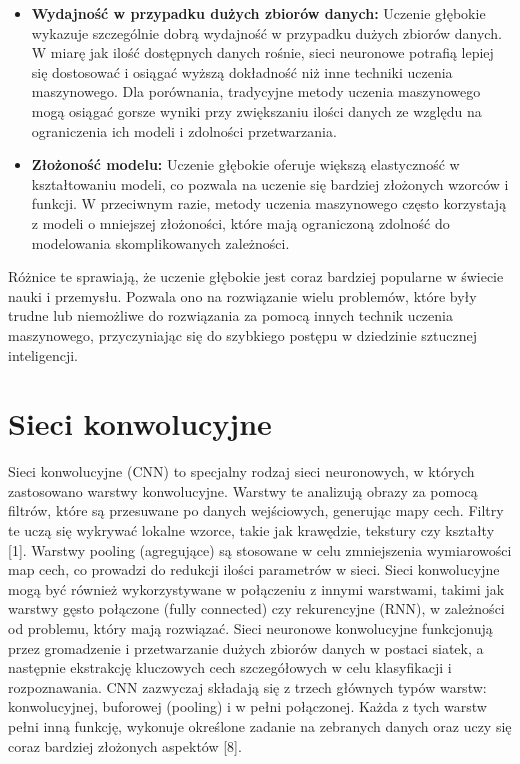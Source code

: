 \begin{itemize}
\item \textbf{Wydajność w przypadku dużych zbiorów danych:} Uczenie głębokie wykazuje szczególnie dobrą wydajność w przypadku dużych zbiorów danych. W miarę jak ilość dostępnych danych rośnie, sieci neuronowe potrafią lepiej się dostosować i osiągać wyższą dokładność niż inne techniki uczenia maszynowego. Dla porównania, tradycyjne metody uczenia maszynowego mogą osiągać gorsze wyniki przy zwiększaniu ilości danych ze względu na ograniczenia ich modeli i zdolności przetwarzania.

\item \textbf{Złożoność modelu:} Uczenie głębokie oferuje większą elastyczność w kształtowaniu modeli, co pozwala na uczenie się bardziej złożonych wzorców i funkcji. W przeciwnym razie, metody uczenia maszynowego często korzystają z modeli o mniejszej złożoności, które mają ograniczoną zdolność do modelowania skomplikowanych zależności.

\end{itemize}

Różnice te sprawiają, że uczenie głębokie jest coraz bardziej popularne w świecie nauki i przemysłu. Pozwala ono na rozwiązanie wielu problemów, które były trudne lub niemożliwe do rozwiązania za pomocą innych technik uczenia maszynowego, przyczyniając się do szybkiego postępu w dziedzinie sztucznej inteligencji.

\section{Sieci konwolucyjne}
Sieci konwolucyjne (CNN) to specjalny rodzaj sieci neuronowych, w których zastosowano warstwy konwolucyjne. Warstwy te analizują obrazy za pomocą filtrów, które są przesuwane po danych wejściowych, generując mapy cech. Filtry te uczą się wykrywać lokalne wzorce, takie jak krawędzie, tekstury czy kształty [1]. Warstwy pooling (agregujące) są stosowane w celu zmniejszenia wymiarowości map cech, co prowadzi do redukcji ilości parametrów w sieci. Sieci konwolucyjne mogą być również wykorzystywane w połączeniu z innymi warstwami, takimi jak warstwy gęsto połączone (fully connected) czy rekurencyjne (RNN), w zależności od problemu, który mają rozwiązać. Sieci neuronowe konwolucyjne funkcjonują przez gromadzenie i przetwarzanie dużych zbiorów danych w postaci siatek, a następnie ekstrakcję kluczowych cech szczegółowych w celu klasyfikacji i rozpoznawania. CNN zazwyczaj składają się z trzech głównych typów warstw: konwolucyjnej, buforowej (pooling) i w pełni połączonej. Każda z tych warstw pełni inną funkcję, wykonuje określone zadanie na zebranych danych oraz uczy się coraz bardziej złożonych aspektów [8].

